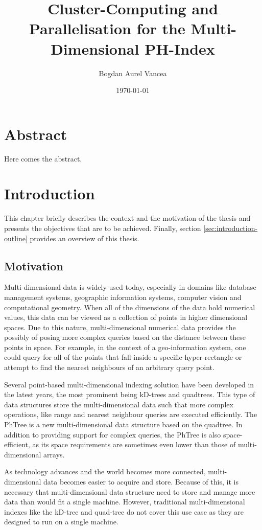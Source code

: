 \documentclass[11pt,a4paper]{globis-book}
\title{Cluster-Computing and Parallelisation for the
    Multi-Dimensional PH-Index}
\author{Bogdan Aurel Vancea}
\institute{Institute of Information Systems}
\date{\today}
\begin{document}
\frontmatter
\maketitlepage
\cleardoublepage
{}

\chapter*{Abstract}

Here comes the abstract.

\tableofcontents

\mainmatter


\chapter{Introduction}
This chapter briefly describes the context and the motivation of the thesis and presents the objectives that are to be achieved. Finally, section \ref{sec:introduction-outline} provides an overview of this thesis.

\section{Motivation}
Multi-dimensional data is widely used today, especially in domains like database management systems, geographic information systems, computer vision and computational geometry. When all of the dimensions of the data hold numerical values, this data can be viewed as a collection of points in higher dimensional spaces. Due to this nature, multi-dimensional numerical data provides the possibly of posing more complex queries based on the distance between these points in space. For example, in the context of a geo-information system, one could query for all of the points that fall inside a specific hyper-rectangle or attempt to find the nearest neighbours of an arbitrary query point.

Several point-based multi-dimensional indexing solution have been developed in the latest years, the most prominent being kD-trees and quadtrees. This type of data structures store the multi-dimensional data such that more complex operations, like range and nearest neighbour queries are executed efficiently. The PhTree is a new multi-dimensional data structure based on the quadtree. In addition to providing support for complex queries, the PhTree is also space-efficient, as its space requirements are sometimes even lower than those of multi-dimensional arrays. 

As technology advances and the world becomes more connected, multi-dimensional data becomes easier to acquire and store. Because of this, it is necessary that multi-dimensional data structure need to store and manage more data than would fit a single machine. However, traditional multi-dimensional indexes like the kD-tree and quad-tree do not cover this use case as they are designed to run on a single machine.
\end{document}
